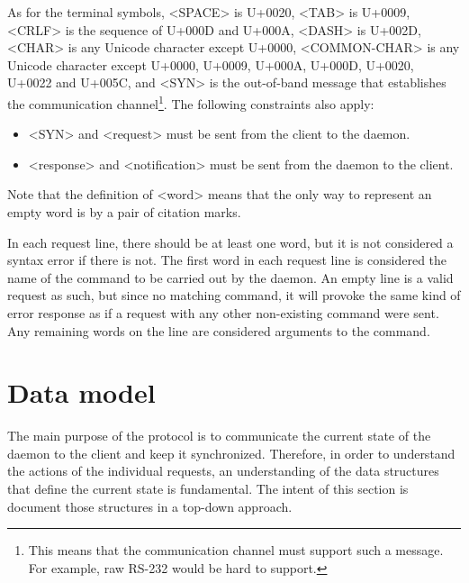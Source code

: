 \documentclass[twoside,a4paper,11pt]{article}
\begin{document}
As for the terminal symbols, <SPACE> is U+0020, <TAB> is U+0009,
<CRLF> is the sequence of U+000D and U+000A, <DASH> is U+002D, <CHAR>
is any Unicode character except U+0000, <COMMON-CHAR> is any
Unicode character except U+0000, U+0009, U+000A, U+000D, U+0020,
U+0022 and U+005C, and <SYN> is the out-of-band message that
establishes the communication channel\footnote{This means that the
  communication channel must support such a message. For example, raw
  RS-232 would be hard to support.}. The following constraints also
apply:
\begin{itemize}
\item <SYN> and <request> must be sent from the client to the daemon.
\item <response> and <notification> must be sent from the daemon to
  the client.
\end{itemize}
Note that the definition of <word> means that the only way to
represent an empty word is by a pair of citation marks.

In each request line, there should be at least one word, but it is not
considered a syntax error if there is not. The first word in each
request line is considered the name of the command to be carried out
by the daemon. An empty line is a valid request as such, but since no
matching command, it will provoke the same kind of error response as
if a request with any other non-existing command were sent. Any
remaining words on the line are considered arguments to the command.

\section{Data model}

The main purpose of the protocol is to communicate the current state
of the daemon to the client and keep it synchronized. Therefore, in
order to understand the actions of the individual requests, an
understanding of the data structures that define the current state is
fundamental. The intent of this section is document those structures
in a top-down approach.
\end{document}
